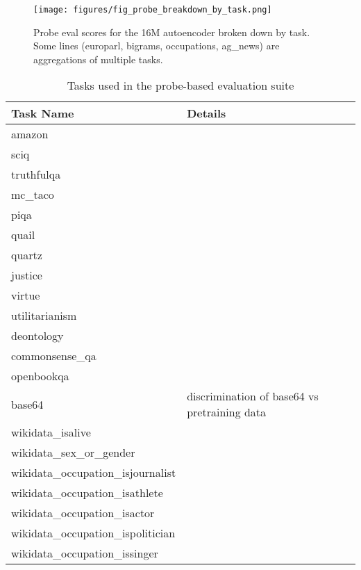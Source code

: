 \begin{figure}[h]
    \centering
    \texttt{[image: figures/fig\_probe\_breakdown\_by\_task.png]}
    \caption{Probe eval scores for the 16M autoencoder broken down by task. Some lines (europarl, bigrams, occupations, ag\_news) are aggregations of multiple tasks.}
    \label{fig:probes-by-task}
\end{figure}

\begin{table}[!ht]
\centering
\caption{Tasks used in the probe-based evaluation suite}
\label{table:probe-eval}
\begin{tabular}{|l|l|}
\hline
\textbf{Task Name} & \textbf{Details} \\ \hline
amazon & \citet{mcauley2013hidden} \\ \hline
sciq &  \citet{welbl2017sciq} \\ \hline
truthfulqa & \citet{lin2021truthfulqa} \\ \hline
mc\_taco & \citet{zhou2019mctaco} \\ \hline
piqa & \citet{Bisk2020} \\ \hline
quail & \citet{rogers2020getting} \\ \hline
quartz & \citet{tafjord2019quartz} \\ \hline
justice & \multirow{4}{*}{\citet{hendrycks2020aligning}} \\ \cline{1-1}
virtue & \\ \cline{1-1}
utilitarianism & \\ \cline{1-1}
deontology & \\ \hline
commonsense\_qa &  \citet{talmor2022commonsenseqa} \\ \hline
openbookqa & \citet{OpenBookQA2018} \\ \hline
base64 & discrimination of base64 vs pretraining data \\ \hline
wikidata\_isalive & \multirow{25}{*}{\citet{gurnee2023finding}} \\ \cline{1-1}
wikidata\_sex\_or\_gender & \\ \cline{1-1}
wikidata\_occupation\_isjournalist & \\ \cline{1-1}
wikidata\_occupation\_isathlete & \\ \cline{1-1}
wikidata\_occupation\_isactor & \\ \cline{1-1}
wikidata\_occupation\_ispolitician & \\ \cline{1-1}
wikidata\_occupation\_issinger & \\ \cline{1-1}

\end{tabular}
\end{table}

